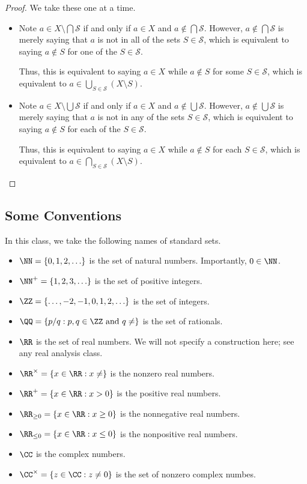 \begin{proof}
	We take these one at a time.
	\begin{itemize}
		\item Note $a\in X\setminus\bigcap\mathcal S$ if and only if $a\in X$ and $a\notin\bigcap\mathcal S$. However, $a\notin\bigcap\mathcal S$ is merely saying that $a$ is not in all of the sets $S\in\mathcal S$, which is equivalent to saying $a\notin S$ for one of the $S\in\mathcal S$.

		Thus, this is equivalent to saying $a\in X$ while $a\notin S$ for some $S\in\mathcal S$, which is equivalent to $a\in\bigcup_{S\in\mathcal S}(X\setminus S)$.
		\item Note $a\in X\setminus\bigcup\mathcal S$ if and only if $a\in X$ and $a\notin\bigcup\mathcal S$. However, $a\notin\bigcup\mathcal S$ is merely saying that $a$ is not in any of the sets $S\in\mathcal S$, which is equivalent to saying $a\notin S$ for each of the $S\in\mathcal S$.

		Thus, this is equivalent to saying $a\in X$ while $a\notin S$ for each $S\in\mathcal S$, which is equivalent to $a\in\bigcap_{S\in\mathcal S}(X\setminus S)$.
		\qedhere
	\end{itemize}
\end{proof}

\subsection{Some Conventions}
In this class, we take the following names of standard sets.
\begin{itemize}
	\item $\NN=\{0,1,2,\ldots\}$ is the set of natural numbers. Importantly, $0\in\NN$.
	\item $\NN^+=\{1,2,3,\ldots\}$ is the set of positive integers.
	\item $\ZZ=\{\ldots,-2,-1,0,1,2,\ldots\}$ is the set of integers.
	\item $\QQ=\{p/q:p,q\in\ZZ\text{ and }q\ne\}$ is the set of rationals.
	\item $\RR$ is the set of real numbers. We will not specify a construction here; see any real analysis class.
	\item $\RR^\times=\{x\in\RR:x\ne\}$ is the nonzero real numbers.
	\item $\RR^+=\{x\in\RR:x>0\}$ is the positive real numbers.
	\item $\RR_{\ge0}=\{x\in\RR:x\ge0\}$ is the nonnegative real numbers.
	\item $\RR_{\le0}=\{x\in\RR:x\le0\}$ is the nonpositive real numbers.
	\item $\CC$ is the complex numbers.
	\item $\CC^\times=\{z\in\CC:z\ne0\}$ is the set of nonzero complex numbes.
\end{itemize}

